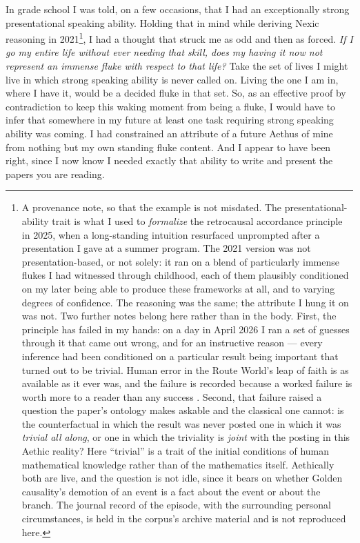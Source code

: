 \documentclass[11pt]{article}
\numberwithin{equation}{section}
\theoremstyle{plain}
\theoremstyle{definition}
\theoremstyle{remark}
\begin{document}
In grade school I was told, on a few occasions, that I had an
exceptionally strong presentational speaking ability. Holding that in
mind while deriving Nexic reasoning in 2021\footnote{A provenance note, so that the example is not misdated. The presentational-ability trait is what I used to \emph{formalize} the retrocausal accordance principle in 2025, when a long-standing intuition resurfaced unprompted after a presentation I gave at a summer program. The 2021 version was not presentation-based, or not solely: it ran on a blend of particularly immense flukes I had witnessed through childhood, each of them plausibly conditioned on my later being able to produce these frameworks at all, and to varying degrees of confidence. The reasoning was the same; the attribute I hung it on was not. Two further notes belong here rather than in the body. First, the principle has failed in my hands: on a day in April 2026 I ran a set of guesses through it that came out wrong, and for an instructive reason --- every inference had been conditioned on a particular result being important that turned out to be trivial. Human error in the Route World's leap of faith is as available as it ever was, and the failure is recorded because a worked failure is worth more to a reader than any success \cite{koide1983new, Brannen2006TheLM}. Second, that failure raised a question the paper's ontology makes askable and the classical one cannot: is the counterfactual in which the result was never posted one in which it was \emph{trivial all along}, or one in which the triviality is \emph{joint} with the posting in this Aethic reality? Here ``trivial'' is a trait of the initial conditions of human mathematical knowledge rather than of the mathematics itself. Aethically both are live, and the question is not idle, since it bears on whether Golden causality's demotion of an event is a fact about the event or about the branch. The journal record of the episode, with the surrounding personal circumstances, is held in the corpus's archive material and is not reproduced here.}, I had a thought that struck
me as odd and then as forced. \emph{If I go my entire life without ever
needing that skill, does my having it now not represent an immense fluke
with respect to that life?} Take the set of lives I might live in which
strong speaking ability is never called on. Living the one I am in, where I have it, would be a decided fluke in that set. So, as an
effective proof by contradiction to keep this waking moment from being a
fluke, I would have to infer that somewhere in my future at least one
task requiring strong speaking ability was coming. I had constrained an
attribute of a future Aethus of mine from nothing but my own standing
fluke content. And I appear to have been right, since I now know I
needed exactly that ability to write and present the papers you are
reading.
\end{document}
